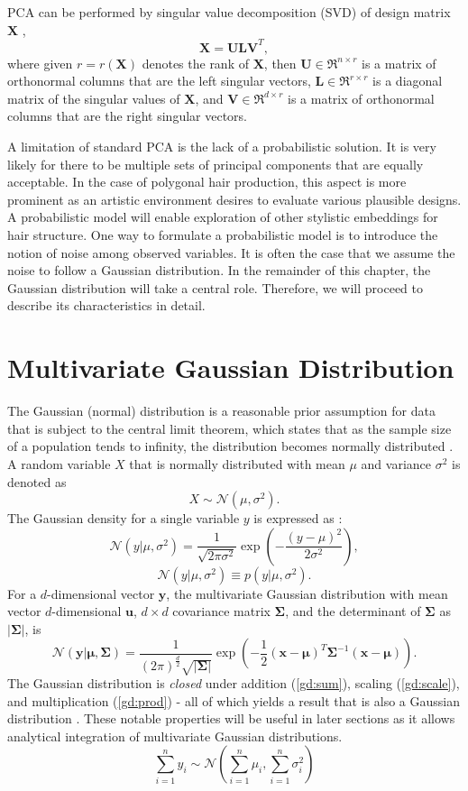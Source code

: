 \documentclass[ %
author={Dillon Keith Diep},
supervisor={Dr. Carl Henrik Ek},
degree={MEng},
title={ART-CG Hair:},
subtitle={Assisted Real-time Content Generation of Stylised Virtual Hair},
type={Research},
year={2017} ]{dissertation}
\begin{document}
PCA can be performed by singular value decomposition (SVD) of design matrix $\bm{X}$ \cite[pp.44-46]{pca2002},
$$\bm{X=ULV}^T,$$
where given $r = r(\bm{X})$ denotes the rank of $\bm{X}$, then
$\bm{U} \in \Re^{n \times r}$ is a matrix of orthonormal columns that are the left singular vectors,
$\bm{L} \in \Re^{r \times r}$ is a diagonal matrix of the singular values of $\bm{X}$, and
$\bm{V} \in \Re^{d \times r}$ is a matrix of orthonormal columns that are the right singular vectors.

A limitation of standard PCA is the lack of a probabilistic solution. 
It is very likely for there to be multiple sets of principal components that are equally acceptable. In the case of polygonal hair production, this aspect is more prominent as an artistic environment desires to evaluate various plausible designs. A probabilistic model will enable exploration of other stylistic embeddings for hair structure. One way to formulate a probabilistic model is to introduce the notion of noise among observed variables. It is often the case that we assume the noise to follow a Gaussian distribution. In the remainder of this chapter, the Gaussian distribution will take a central role. Therefore, we will proceed to describe its characteristics in detail.

\section{Multivariate Gaussian Distribution}
The Gaussian (normal) distribution is a reasonable prior assumption for data that is subject to the central limit theorem, which states that as the sample size of a population tends to infinity, the distribution becomes normally distributed \cite[p.78]{bishop}.
A random variable $X$ that is normally distributed with mean $\mu$ and variance $\sigma^2$ is denoted as
$$X\sim\mathcal{N}(\mu, \sigma^2).$$
The Gaussian density for a single variable $y$ is expressed as \cite[p.78]{bishop}:
$$\mathcal{N}(y|\mu, \sigma^2)=\frac{1}{\sqrt{2\pi\sigma^2}}\exp\left(-\frac{(y-\mu)^2}{2\sigma^2}\right),$$
$$\mathcal{N}(y|\mu,\sigma^2) \equiv p(y|\mu,\sigma^2).$$
For a $d$-dimensional vector $\bm{y}$, the multivariate Gaussian distribution with mean vector $d$-dimensional $\bm{u}$, $d \times d$ covariance matrix $\bm{\Sigma}$, and the determinant of $\bm{\Sigma}$ as $\bm{|\Sigma}|$, is
$$\mathcal{N}(\bm{y}|\bm{\mu}, \bm{\Sigma})=\frac{1}{(2\pi)^{\frac{d}{2}}\sqrt{|\bm{\Sigma}|}}
\exp\left(-\frac{1}{2}(\bm{x}-\bm{\mu})^T\bm{\Sigma}^{-1}(\bm{x}-\bm{\mu})\right).$$
The Gaussian distribution is \textit{closed} under addition (\ref{gd:sum}), scaling (\ref{gd:scale}), and multiplication (\ref{gd:prod}) - all of which yields a result that is also a Gaussian distribution \cite[p.200]{gp}. These notable properties will be useful in later sections as it allows analytical integration of multivariate Gaussian distributions.
\begin{equation} \label{gd:sum}
\sum^n_{i=1}y_i\sim\mathcal{N}(\sum^n_{i=1}\mu_i,\sum^n_{i=1}\sigma^2_i)
\end{equation}
\end{document}
